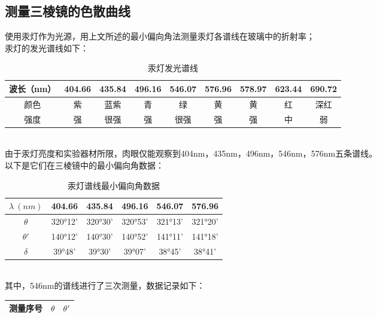 \documentclass[UTF8]{ctexart}
\begin{document}
\subsection{测量三棱镜的色散曲线}
使用汞灯作为光源，用上文所述的最小偏向角法测量汞灯各谱线在玻璃中的折射率；\\
汞灯的发光谱线如下：\\
\begin{table}[h]
    \begin{center}
        \begin{tabular}{|c|c|c|c|c|c|c|c|c|}  
            \hline    
            波长（nm）& 404.66 & 435.84 & 496.16 & 546.07 & 576.96 & 578.97 & 623.44 & 690.72 \\
            \hline
            颜色 & 紫 & 蓝紫  & 青 & 绿 & 黄 & 黄 & 红 & 深红 \\
            \hline
            强度 &强 &很强 & 强 &很强 & 强 & 强 & 中 & 弱 \\
            \hline
        \end{tabular}
        \caption{汞灯发光谱线}
    \end{center}
\end{table}
\\
由于汞灯亮度和实验器材所限，肉眼仅能观察到404nm，435nm，496nm，546nm，576nm五条谱线。
\\
以下是它们在三棱镜中的最小偏向角数据：\\
\begin{table}[h]
    \begin{center}
        \begin{tabular}{|c|c|c|c|c|c|}
        \hline
        \(\lambda \ (nm)\)&404.66 & 435.84 & 496.16 & 546.07 & 576.96 \\
        \hline
        \(\theta\)&320°12'&320°30'&320°53'&321°13'&321°20'\\
        \hline
        \(\theta'\)&140°12'&140°30'&140°52'&141°11'&141°18'\\
        \hline
        \(\delta\)&39°48'&39°30'&39°07'&38°45'&38°41'\\
        \hline
        \end{tabular}
        \caption{汞灯谱线最小偏向角数据}
    \end{center}
\end{table}\\
其中，546nm的谱线进行了三次测量，数据记录如下：\\
\begin{table}[h]
    \begin{center}
        \begin{tabular}{|c|c|c|}
            \hline
            测量序号 & \(\theta\) & \(\theta'\) \\
            \hline

        \end{tabular}
    \end{center}
\end{table}
\end{document}
